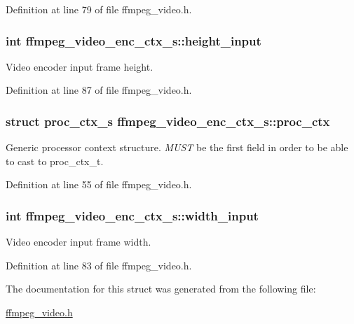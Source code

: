 Definition at line 79 of file ffmpeg\+\_\+video.\+h.

\subsubsection[{\texorpdfstring{height\+\_\+input}{height_input}}]{\setlength{\rightskip}{0pt plus 5cm}int ffmpeg\+\_\+video\+\_\+enc\+\_\+ctx\+\_\+s\+::height\+\_\+input}\hypertarget{structffmpeg__video__enc__ctx__s_a2c82f6dae841d2a04b4f448150c58d76}{}\label{structffmpeg__video__enc__ctx__s_a2c82f6dae841d2a04b4f448150c58d76}
Video encoder input frame height. 

Definition at line 87 of file ffmpeg\+\_\+video.\+h.

\subsubsection[{\texorpdfstring{proc\+\_\+ctx}{proc_ctx}}]{\setlength{\rightskip}{0pt plus 5cm}struct {\bf proc\+\_\+ctx\+\_\+s} ffmpeg\+\_\+video\+\_\+enc\+\_\+ctx\+\_\+s\+::proc\+\_\+ctx}\hypertarget{structffmpeg__video__enc__ctx__s_a44328c80df7eae90b06840a077e60ef3}{}\label{structffmpeg__video__enc__ctx__s_a44328c80df7eae90b06840a077e60ef3}
Generic processor context structure. {\itshape M\+U\+ST} be the first field in order to be able to cast to proc\+\_\+ctx\+\_\+t. 

Definition at line 55 of file ffmpeg\+\_\+video.\+h.

\subsubsection[{\texorpdfstring{width\+\_\+input}{width_input}}]{\setlength{\rightskip}{0pt plus 5cm}int ffmpeg\+\_\+video\+\_\+enc\+\_\+ctx\+\_\+s\+::width\+\_\+input}\hypertarget{structffmpeg__video__enc__ctx__s_ae173fc838cf18ead8354f51db4d7aec6}{}\label{structffmpeg__video__enc__ctx__s_ae173fc838cf18ead8354f51db4d7aec6}
Video encoder input frame width. 

Definition at line 83 of file ffmpeg\+\_\+video.\+h.



The documentation for this struct was generated from the following file\+:\begin{DoxyCompactItemize}
\item 
\hyperlink{ffmpeg__video_8h}{ffmpeg\+\_\+video.\+h}\end{DoxyCompactItemize}
